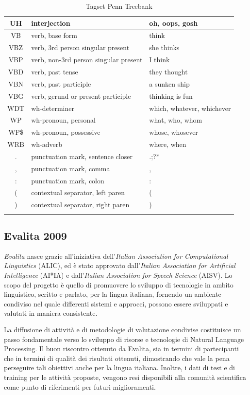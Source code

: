 \begin{longtable}{| c | p{} | p{} |}
  UH & interjection & oh, oops, gosh  \\ \hline
  VB & verb, base form & think  \\ \hline
  VBZ & verb, 3rd person singular present & she thinks  \\ \hline
  VBP & verb, non-3rd person singular present & I think  \\ \hline
  VBD & verb, past tense & they thought  \\ \hline
  VBN & verb, past participle & a sunken ship  \\ \hline
  VBG & verb, gerund or present participle & thinking is fun  \\ \hline
  WDT & wh-determiner & which, whatever, whichever  \\ \hline
  WP & wh-pronoun, personal & what, who, whom  \\ \hline
  WP\$ & wh-pronoun, possessive & whose, whosever  \\ \hline
  WRB & wh-adverb & where, when  \\ \hline
  . & punctuation mark, sentence closer & .;?*  \\ \hline
  , & punctuation mark, comma & ,  \\ \hline
  : & punctuation mark, colon & :  \\ \hline
  ( & contextual separator, left paren & (  \\ \hline
  ) & contextual separator, right paren & ) \\ \hline
  \caption{Tagset Penn Treebank} \label{tab:penn-tagset}
\end{longtable}

\subsection{Evalita 2009}
\emph{Evalita} nasce grazie all'iniziativa dell'\emph{Italian Association for Computational Linguistics} (ALIC),
ed \`e stato approvato dall'\emph{Italian Association for Artificial Intelligence} (AI*IA)
e dall'\emph{Italian Association for Speech Science} (AISV).
Lo scopo del progetto \`e quello di promuovere lo sviluppo di tecnologie in ambito linguistico,
scritto e parlato, per la lingua italiana, fornendo un ambiente condiviso nel quale
differenti sistemi e approcci, possono essere sviluppati e valutati in maniera consistente.

La diffusione di attivit\`a e di metodologie di valutazione condivise costituisce un passo fondamentale
verso lo sviluppo di risorse e tecnologie di Natural Language Processing. Il buon riscontro
ottenuto da Evalita, sia in termini di partecipanti che in termini di qualit\`a dei risultati ottenuti,
dimostrando che vale la pena perseguire tali obiettivi anche per la lingua italiana.
Inoltre, i dati di test e di training per le attivit\`a proposte, vengono resi disponibili alla
comunit\`a scientifica come punto di riferimenti per futuri miglioramenti.

